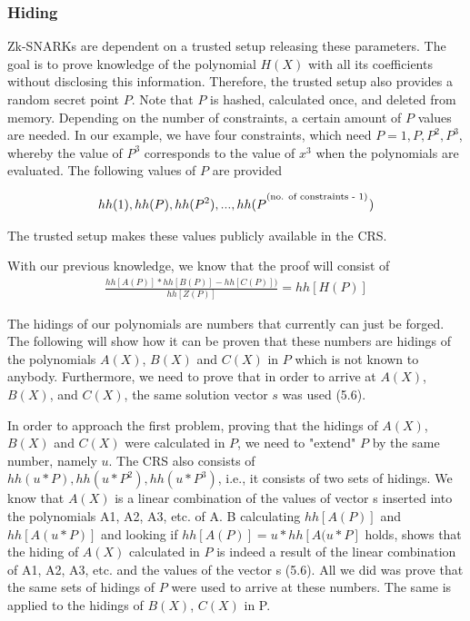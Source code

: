\subsubsection{Hiding}
Zk-SNARKs are dependent on a trusted setup releasing these parameters. The goal is to prove knowledge of the polynomial \(H(X)\) with all its coefficients without disclosing this information. Therefore, the trusted setup also provides a random secret point \(P\). Note that \(P\) is hashed, calculated once, and deleted from memory. Depending on the number of constraints, a certain amount of \(P\) values are needed. In our example, we have four constraints, which need \(P = {1, P, P^2, P^3}\), whereby the value of \(P^3\) corresponds to the value of \(x^3\) when the polynomials are evaluated. The following values of \(P\) are provided

\begin{align}
    hh(1), hh(P), hh(P^2), ..., hh(P^\textsuperscript{(no. of constraints - 1)})
\end{align}

The trusted setup makes these values publicly available in the CRS.

With our previous knowledge, we know that the proof will consist of
\begin{align}
    \frac{hh[A(P)] * hh[B(P)] - hh[C(P)])}{hh[Z(P)]} = hh[H(P)]
\end{align}

The hidings of our polynomials are numbers that currently can just be forged. The following will show how it can be proven that these numbers are hidings of the polynomials \(A(X)\), \(B(X)\) and \(C(X)\) in \(P\) which is not known to anybody. Furthermore, we need to prove that in order to arrive at \(A(X)\), \(B(X)\), and \(C(X)\), the same solution vector \(s\) was used (5.6). 

In order to approach the first problem, proving that the hidings of \(A(X)\),  \(B(X)\) and \(C(X)\) were calculated in \(P\), we need to "extend" \(P\) by the same number, namely \(u\). The CRS also consists of \(hh(u*P), hh(u*P^2), hh(u*P^3)\), i.e., it consists of two sets of hidings. We know that \(A(X)\) is a linear combination of the values of vector s inserted into the polynomials A1, A2, A3, etc. of A. B calculating \(hh[A(P)]\) and \(hh[A(u*P)]\) and looking if \(hh[A(P)] = u * hh[A(u*P]\) holds, shows that the hiding of \(A(X)\) calculated in \(P\) is indeed a result of the linear combination of A1, A2, A3, etc. and the values of the vector s (5.6). All we did was prove that the same sets of hidings of \(P\) were used to arrive at these numbers. The same is applied to the hidings of \(B(X)\), \(C(X)\) in P.

